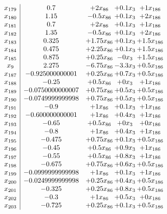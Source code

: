 \documentclass[11pt]{article}
\begin{document}
\[\begin{array}{c| c c@{\hskip 2pt} c@{\hskip 2pt} c@{\hskip 2pt} }
 x_{179}   &  0.7 & + 2 x_{86} & + 0.1 x_{3} & + 1 x_{186}\\
 x_{180}   &  1.15 & -0.5 x_{86} & + 0.1 x_{3} & + 2 x_{186}\\
 x_{181}   &  0.7 & + 2 x_{86} & + 0.1 x_{3} & + 1 x_{186}\\
 x_{182}   &  1.35 & -0.5 x_{86} & + 0.1 x_{3} & + 2 x_{186}\\
 x_{183}   &  0.325 & + 1.75 x_{86} & + 0.1 x_{3} & + 1.5 x_{186}\\
 x_{184}   &  0.475 & + 2.25 x_{86} & + 0.1 x_{3} & + 1.5 x_{186}\\
 x_{185}   &  0.875 & + 0.25 x_{86} & -0 x_{3} & + 1.5 x_{186}\\
 x_{9}   &  2.275 & -6.75 x_{86} & -3.3 x_{3} & + 0.5 x_{186}\\
 x_{187}   &  -0.925000000001 & + 0.25 x_{86} & + 0.7 x_{3} & + 0.5 x_{186}\\
 x_{188}   &  -0.25 & + 0.5 x_{86} & + 0 x_{3} & + 1 x_{186}\\
 x_{189}   &  -0.0750000000007 & + 0.75 x_{86} & + 0.5 x_{3} & + 0.5 x_{186}\\
 x_{190}   &  -0.0749999999998 & + 0.75 x_{86} & + 0.5 x_{3} & + 0.5 x_{186}\\
 x_{191}   &  -0.9 & + 1 x_{86} & + 0.1 x_{3} & + 1 x_{186}\\
 x_{192}   &  -0.600000000001 & + 1 x_{86} & + 0.4 x_{3} & + 1 x_{186}\\
 x_{193}   &  -0.65 & + 0.5 x_{86} & + 0 x_{3} & + 0 x_{186}\\
 x_{194}   &  -0.8 & + 1 x_{86} & + 0.4 x_{3} & + 1 x_{186}\\
 x_{195}   &  -0.475 & + 0.75 x_{86} & + 0.1 x_{3} & + 0.5 x_{186}\\
 x_{196}   &  -0.45 & + 0.5 x_{86} & + 0.9 x_{3} & + 1 x_{186}\\
 x_{197}   &  -0.55 & + 0.5 x_{86} & + 0.8 x_{3} & + 1 x_{186}\\
 x_{198}   &  -0.675 & + 0.75 x_{86} & + 0.6 x_{3} & + 0.5 x_{186}\\
 x_{199}   &  -0.0999999999998 & + 1 x_{86} & + 0.1 x_{3} & + 1 x_{186}\\
 x_{200}   &  -0.0249999999998 & + 0.25 x_{86} & + 0.4 x_{3} & + 0.5 x_{186}\\
 x_{201}   &  -0.325 & + 0.25 x_{86} & + 0.8 x_{3} & + 0.5 x_{186}\\
 x_{202}   &  -0.3 & + 1 x_{86} & + 0.5 x_{3} & + 0 x_{186}\\
 x_{203}   &  -0.725 & + 0.25 x_{86} & + 0.1 x_{3} & + 0.5 x_{186}\\

\end{array}\]
\end{document}

